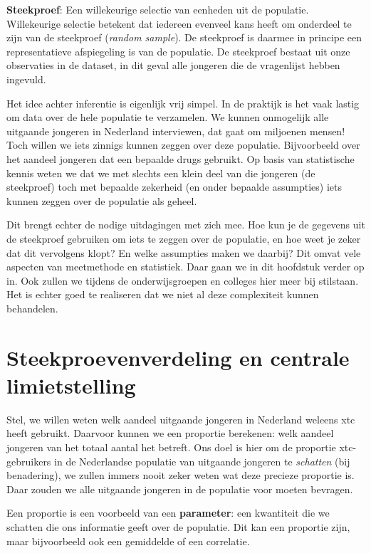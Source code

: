 \documentclass[
  letterpaper,
  DIV=11,
  numbers=noendperiod]{scrreprt}
\begin{document}
\textbf{Steekproef}: Een willekeurige selectie van eenheden uit de
populatie. Willekeurige selectie betekent dat iedereen evenveel kans
heeft om onderdeel te zijn van de steekproef (\emph{random sample}). De
steekproef is daarmee in principe een representatieve afspiegeling is
van de populatie. De steekproef bestaat uit onze observaties in de
dataset, in dit geval alle jongeren die de vragenlijst hebben ingevuld.

Het idee achter inferentie is eigenlijk vrij simpel. In de praktijk is
het vaak lastig om data over de hele populatie te verzamelen. We kunnen
onmogelijk alle uitgaande jongeren in Nederland interviewen, dat gaat om
miljoenen mensen! Toch willen we iets zinnigs kunnen zeggen over deze
populatie. Bijvoorbeeld over het aandeel jongeren dat een bepaalde drugs
gebruikt. Op basis van statistische kennis weten we dat we met slechts
een klein deel van die jongeren (de steekproef) toch met bepaalde
zekerheid (en onder bepaalde assumpties) iets kunnen zeggen over de
populatie als geheel.

Dit brengt echter de nodige uitdagingen met zich mee. Hoe kun je de
gegevens uit de steekproef gebruiken om iets te zeggen over de
populatie, en hoe weet je zeker dat dit vervolgens klopt? En welke
assumpties maken we daarbij? Dit omvat vele aspecten van meetmethode en
statistiek. Daar gaan we in dit hoofdstuk verder op in. Ook zullen we
tijdens de onderwijsgroepen en colleges hier meer bij stilstaan. Het is
echter goed te realiseren dat we niet al deze complexiteit kunnen
behandelen.

\section{Steekproevenverdeling en centrale
limietstelling}\label{sec-steekproefcentraallimiet}

Stel, we willen weten welk aandeel uitgaande jongeren in Nederland
weleens xtc heeft gebruikt. Daarvoor kunnen we een proportie berekenen:
welk aandeel jongeren van het totaal aantal het betreft. Ons doel is
hier om de proportie xtc-gebruikers in de Nederlandse populatie van
uitgaande jongeren te \emph{schatten} (bij benadering), we zullen immers
nooit zeker weten wat deze precieze proportie is. Daar zouden we alle
uitgaande jongeren in de populatie voor moeten bevragen.

Een proportie is een voorbeeld van een \textbf{parameter}: een
kwantiteit die we schatten die ons informatie geeft over de populatie.
Dit kan een proportie zijn, maar bijvoorbeeld ook een gemiddelde of een
correlatie.
\end{document}
